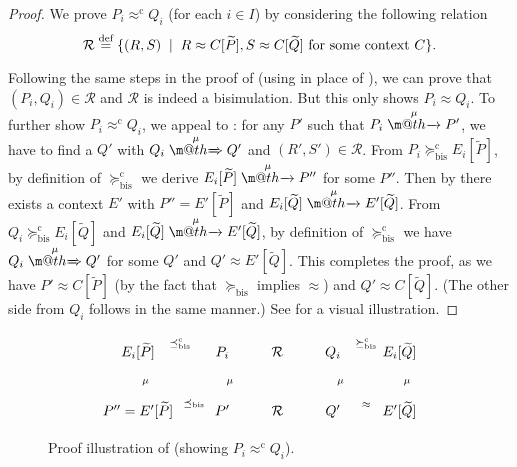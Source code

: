 \documentclass[GCNS]{yincog}
\makeatletter
\def \rightarrowfill{$\m@th\mathord{\smash-}\mkern-6mu%
  \cleaders\hbox{$\mkern-2mu\mathord{\smash-}\mkern-2mu$}\hfill
  \mkern-6mu\mathord\rightarrow$}
\def \rightarrowfillWEAK{$\m@th\mathord{\smash=}\mkern-6mu%
  \cleaders\hbox{$\mkern-2mu\mathord{\smash=}\mkern-2mu$}\hfill
  \mkern-6mu\mathord\Rightarrow$}
\theoremstyle{remark}
\theoremstyle{theorem}
\theoremstyle{remark}
\newcommand{\arr}[1]{\mathrel{\stackrel{{\;\;#1\;\;}}{\mbox{\rightarrowfill}}}}
\newcommand{\Arr}[1]{\mathrel{\stackrel{{\;\;#1\;\;}}{\mbox{\rightarrowfillWEAK}}}}
\newcommand{\ctvtex}[1]{ C \brac{#1} }
\newcommand{\qct}{ C }
\newcommand{\brac}[1]{[#1] }
\def\Rvtex{\mathcal{R}}
\def\stvtex{\; \mid \;}
\def\DSdefi{\stackrel{\text{def}}{=}}
\renewcommand{\tilde}{\widetilde}
\newcommand{\rapprox}{\mathrel{\approx^{\mathrm{c}}}}
\newcommand{\wbvtex}{\approx}
\newcommand{\mcontrBIS}{\mathrel{\succeq_{\mathrm{bis}}}}
\newcommand{\rcontr}{\mathrel{\succeq^{\mathrm{c}}_{\mathrm{bis}}}}
\newcommand{\til}{\tilde}
\makeatother
\begin{document}
\begin{proof}
We prove $P_i \rapprox Q_i$ (for each $i \in I$) by considering the following
relation
%
\begin{equation*}
\Rvtex \DSdefi \{(R,S) \stvtex R \wbvtex \ctvtex{\til P}, S \wbvtex
\ctvtex{\til Q} \mbox{~for some context $\qct $} \} .
\end{equation*}

Following the same steps in the proof of 
(using  in place of ), we can
prove that $(P_i, Q_i) \in \Rvtex $ and $\Rvtex $ is indeed a bisimulation.
But this only shows $P_i \wbvtex Q_i$. To further show
$P_i \rapprox Q_i$, we appeal to : for
any $P'$ such that $P_i \arr{\mu} P'$, we have to find a $Q'$ with
$Q_i \Arr{\mu} Q'$ and $(R',S') \in \Rvtex $. From
$P_i \rcontr E_i[{\til P}]$, by definition of $\rcontr $ we derive
$E_i[{\til P}] \arr{\mu} P''$ for some $P''$. Then by 
there exists a context $E'$ with $P'' = E'[{\til P}]$ and
$E_i[{\til Q}] \arr{\mu} E'[{\til Q}]$. From
$Q_i \rcontr E_i[{\til Q}]$ and
$E_i[{\til Q}] \arr{\mu} E'[{\til Q}]$, by definition of $\rcontr $ we
have $Q_i \Arr{\mu} Q'$ for some $Q'$ and $Q' \wbvtex E'[{\til Q}]$. This
completes the proof, as we have $P' \wbvtex C[{\til P}]$ (by the fact that
$\mcontrBIS $ implies $\wbvtex $) and $Q' \wbvtex C[{\til Q}]$. (The other
side from $Q_i$ follows in the same manner.) See  for
a visual illustration.
\end{proof}

\begin{figure}%
\vspace{-12pt}%
\begin{sgmlfig}\normalsize
%
$$
\xymatrix{
{E_i[{\til P}]} \ar@{.}[r]^{\preceq ^{\mathrm{c}}_{\mathrm{bis}}} \ar@{->}[d]^{\mu} & {P_i} \ar@{-}[r]
\ar@{->}[d]^{\mu} & {\Rvtex} \ar@{-}[r] & {Q_i} \ar@{.}[r]^{\rcontr}
\ar@{=>}[d]^{\mu} & {E_i[{\til Q}]} \ar@{->}[d]^{\mu} \\
{P'' = E'[{\til P}]} \ar@{.}[r]^{\qquad \preceq _{\mathrm{bis}}} & {P'} \ar@{-}[r] & {\Rvtex} \ar@{-}[r] & {Q'} \ar@{.}[r]^{\wbvtex}
& {E'[{\til Q}]} \\
}
%
$$\vspace{-12pt}
\end{sgmlfig}
%
\caption{Proof illustration of  (showing
$P_i \rapprox Q_i$).}
 \label{fig:314}
\end{figure}
\end{document}
